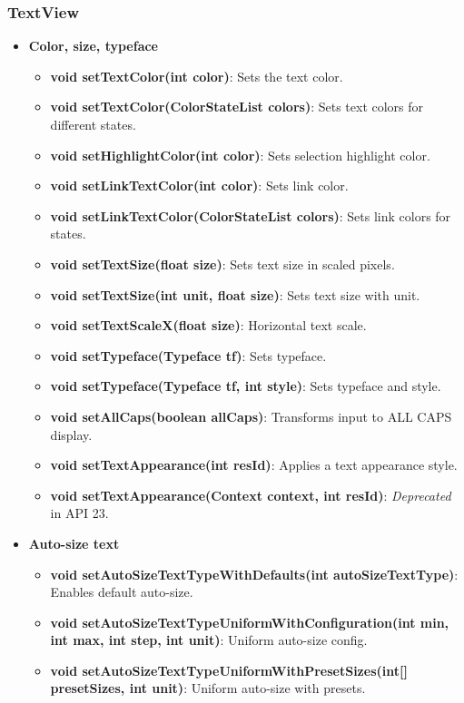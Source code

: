 \documentclass{report}
\begin{document}
\begin{itemize}
    \subsubsection{TextView}
    \begin{itemize}
        \item \textbf{Color, size, typeface}
            \begin{itemize}
                \item \textbf{void setTextColor(int color)}: Sets the text color.
                \item \textbf{void setTextColor(ColorStateList colors)}: Sets text colors for different states.
                \item \textbf{void setHighlightColor(int color)}: Sets selection highlight color.
                \item \textbf{void setLinkTextColor(int color)}: Sets link color.
                \item \textbf{void setLinkTextColor(ColorStateList colors)}: Sets link colors for states.
                \item \textbf{void setTextSize(float size)}: Sets text size in scaled pixels.
                \item \textbf{void setTextSize(int unit, float size)}: Sets text size with unit.
                \item \textbf{void setTextScaleX(float size)}: Horizontal text scale.
                \item \textbf{void setTypeface(Typeface tf)}: Sets typeface.
                \item \textbf{void setTypeface(Typeface tf, int style)}: Sets typeface and style.
                \item \textbf{void setAllCaps(boolean allCaps)}: Transforms input to ALL CAPS display.
                \item \textbf{void setTextAppearance(int resId)}: Applies a text appearance style.
                \item \textbf{void setTextAppearance(Context context, int resId)}: \textit{Deprecated} in API 23.
            \end{itemize}

        \item \textbf{Auto-size text}
            \begin{itemize}
                \item \textbf{void setAutoSizeTextTypeWithDefaults(int autoSizeTextType)}: Enables default auto-size.
                \item \textbf{void setAutoSizeTextTypeUniformWithConfiguration(int min, int max, int step, int unit)}: Uniform auto-size config.
                \item \textbf{void setAutoSizeTextTypeUniformWithPresetSizes(int[] presetSizes, int unit)}: Uniform auto-size with presets.
            \end{itemize}


\end{itemize}
\end{itemize}
\end{document}
